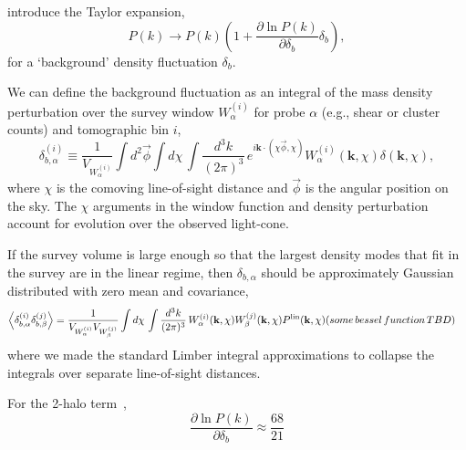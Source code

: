 \documentclass[preprint]{aastex}
\newcommand{\kv}{\mathbf{k}}
\newcommand{\phiv}{\vec{\phi}}
\newcommand{\normdist}{\mathcal{N}}
\begin{document}
\citet{takada2013} introduce the Taylor expansion,
\begin{equation}
	P(k) \rightarrow P(k) \left(
	1 + \frac{\partial \ln P(k)}{\partial \delta_b} \delta_b\right),
\end{equation}
for a `background' density fluctuation $\delta_b$.

We can define the background fluctuation as an integral of the 
mass density perturbation over the survey window $W^{(i)}_{\alpha}$ for  
probe $\alpha$ (e.g., shear or cluster counts) and tomographic bin $i$,
\begin{equation}
	\delta_{b,\alpha}^{(i)} \equiv \frac{1}{V_{W_{\alpha}^{(i)}}}
	\int d^{2}\phiv \int d\chi\,
	\int \frac{d^{3}k}{(2\pi)^3}\,
	e^{i \kv\cdot(\chi\phiv, \chi)}
	W^{(i)}_{\alpha}(\kv, \chi) \delta(\kv, \chi),
\end{equation}
where $\chi$ is the comoving line-of-sight distance and $\phiv$ is the 
angular position on the sky. The $\chi$ arguments in the window function 
and density perturbation account for evolution over the observed light-cone.

If the survey volume is large enough so that the 
largest density modes that fit in the survey are in the linear regime, 
then $\delta_{b,\alpha}$ should be approximately Gaussian distributed 
with zero mean and covariance,
\begin{align}
	\left<\delta_{b,\alpha}^{(i)} \delta_{b,\beta}^{(j)}\right> &=
	\frac{1}{V_{W_{\alpha}^{(i)}} V_{W_{\beta}^{(j)}}}
	\int d\chi\, 
	\int \frac{d^{3}k}{(2\pi)^3}\,
	W^{(i)}_{\alpha}(\kv, \chi) W^{(j)}_{\beta}(\kv,\chi) P^{\rm lin}(\kv,\chi) 
	(some\,bessel\,function\,TBD)
\end{align}
where we made the standard Limber integral approximations to collapse the 
integrals over separate line-of-sight distances.


For the 2-halo term~\citep[eq. 39 of][]{takada2013}, 
\begin{equation}
	\frac{\partial \ln P(k)}{\partial \delta_b} \approx 
	\frac{68}{21}
\end{equation}
\end{document}
